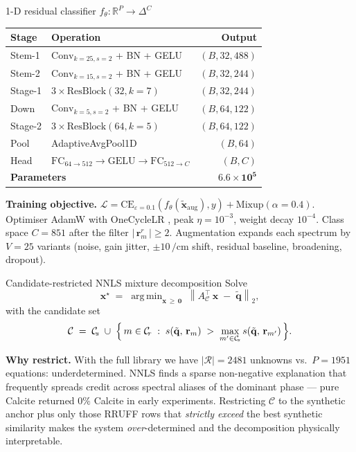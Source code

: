 \documentclass[10pt,aspectratio=169]{beamer}
\newcommand{\cmone}{\si{\per\centi\meter}}
\newcommand{\R}{\mathbb{R}}
\newcommand{\norm}[1]{\left\lVert #1 \right\rVert}
\DeclareMathOperator*{\argmin}{arg\,min}
\begin{document}
\begin{frame}{1-D residual classifier $f_{\theta}: \R^{P} \to \Delta^{C}$}
\centering
\begin{tabular}{@{}llr@{}}
\toprule
\textbf{Stage} & \textbf{Operation} & \textbf{Output}\\
\midrule
Stem-1 & $\mathrm{Conv}_{k=25,s=2}$ + BN + GELU & $(B,32,488)$\\
Stem-2 & $\mathrm{Conv}_{k=15,s=2}$ + BN + GELU & $(B,32,244)$\\
Stage-1 & $3 \times \mathrm{ResBlock}(32,k{=}7)$ & $(B,32,244)$\\
Down   & $\mathrm{Conv}_{k=5,s=2}$ + BN + GELU & $(B,64,122)$\\
Stage-2 & $3 \times \mathrm{ResBlock}(64,k{=}5)$ & $(B,64,122)$\\
Pool   & AdaptiveAvgPool1D & $(B,64)$\\
Head   & $\mathrm{FC}_{64\to 512} \to \mathrm{GELU} \to \mathrm{FC}_{512\to C}$ & $(B,C)$\\
\midrule
\multicolumn{2}{l}{\textbf{Parameters}} & $\mathbf{6.6 \times 10^{5}}$ \\
\bottomrule
\end{tabular}
\smallskip

\raggedright
\textbf{Training objective.}
$\mathcal{L} = \mathrm{CE}_{\varepsilon=0.1}(f_{\theta}(\tilde{\mathbf{x}}_{\mathrm{aug}}), y)
   + \mathrm{Mixup}(\alpha{=}0.4)$.
Optimiser AdamW \cite{loshchilov2019adamw} with OneCycleLR
\cite{smith2019onecycle}, peak $\eta = 10^{-3}$, weight decay $10^{-4}$.
Class space $C = 851$ after the filter $\bigl|\,\mathbf{r}_m^{r}\,\bigr| \geq 2$.
Augmentation expands each spectrum by $V = 25$ variants (noise, gain jitter,
$\pm 10\,\cmone$ shift, residual baseline, broadening, dropout).
\end{frame}

\begin{frame}{Candidate-restricted NNLS mixture decomposition}
Solve
\[
  \mathbf{x}^{\star}
  \;=\;
  \argmin_{\mathbf{x} \,\geq\, \mathbf{0}}\;
   \norm{A_{\mathcal{C}}^{\!\top}\,\mathbf{x} \;-\; \tilde{\mathbf{q}}}_{2},
\]
with the candidate set
\[
  \mathcal{C} \;=\;
   \mathcal{C}_{\!s}
   \;\cup\;
   \Bigl\{\, m \in \mathcal{C}_{\!r}
          \;:\;
          s(\tilde{\mathbf{q}},\,\mathbf{r}_{m})
          \;>\; \max_{m' \in \mathcal{C}_{\!s}}
                s(\tilde{\mathbf{q}},\,\mathbf{r}_{m'}) \,\Bigr\}.
\]
\smallskip

\textbf{Why restrict.}
With the full library we have $|\mathcal{R}| = 2481$ unknowns vs.\ $P = 1951$
equations: \alert{underdetermined}. NNLS finds a sparse non-negative
explanation that frequently spreads credit across spectral aliases of the
dominant phase --- pure Calcite returned $0\%$ Calcite in early experiments.
Restricting $\mathcal{C}$ to the synthetic anchor plus only those RRUFF rows
that \emph{strictly exceed} the best synthetic similarity makes the system
\emph{over}-determined and the decomposition physically interpretable.
\end{frame}
\end{document}
